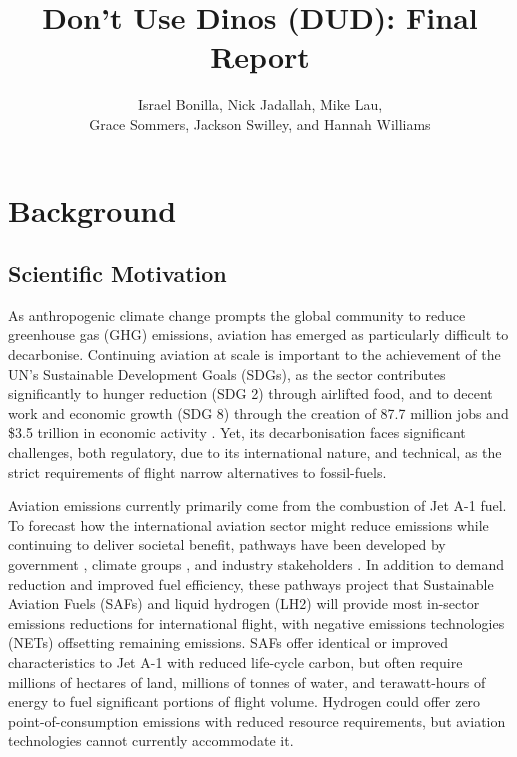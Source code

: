 \documentclass{article}
\title{Don't Use Dinos (DUD): Final Report}
\author{Israel Bonilla, Nick Jadallah, Mike Lau, \\
Grace Sommers, Jackson Swilley, and Hannah Williams}
\begin{document}
\maketitle
\section*{Background}
\subsection*{Scientific Motivation}
As anthropogenic climate change prompts the global community to reduce greenhouse gas (GHG) emissions, aviation has emerged as particularly difficult to decarbonise. Continuing aviation at scale is important to the achievement of the UN’s Sustainable Development Goals (SDGs), as the sector contributes significantly to hunger reduction (SDG 2) through airlifted food, and to decent work and economic growth (SDG 8) through the creation of 87.7 million jobs and \$3.5 trillion in economic activity \citep{air_transport_action_group_sustainable_2020}. Yet, its decarbonisation faces significant challenges, both regulatory, due to its international nature, and technical, as the strict requirements of flight narrow alternatives to fossil-fuels.\par
Aviation emissions currently primarily come from the combustion of Jet A-1 fuel. To forecast how the international aviation sector might reduce emissions while continuing to deliver societal benefit, pathways have been developed by government \citep{department_for_transport_jet_2021,itf_decarbonising_2021}, climate groups \citep{climate_change_committee_sixth_2020, transport__environment_roadmap_2018, fleming_flight_2020}, and industry stakeholders \citep{sustainable_aviation_sustainable_2020, nlr_-_royal_netherlands_aerospace_centre_destination_2021}. In addition to demand reduction and improved fuel efficiency, these pathways project that Sustainable Aviation Fuels (SAFs) and liquid hydrogen (LH2) will provide most in-sector emissions reductions for international flight, with negative emissions technologies (NETs) offsetting remaining emissions. SAFs offer identical or improved characteristics to Jet A-1 with reduced life-cycle carbon, but often require millions of hectares of land, millions of tonnes of water, and terawatt-hours of energy to fuel significant portions of flight volume. Hydrogen could offer zero point-of-consumption emissions with reduced resource requirements, but aviation technologies cannot currently accommodate it. \par
\end{document}
